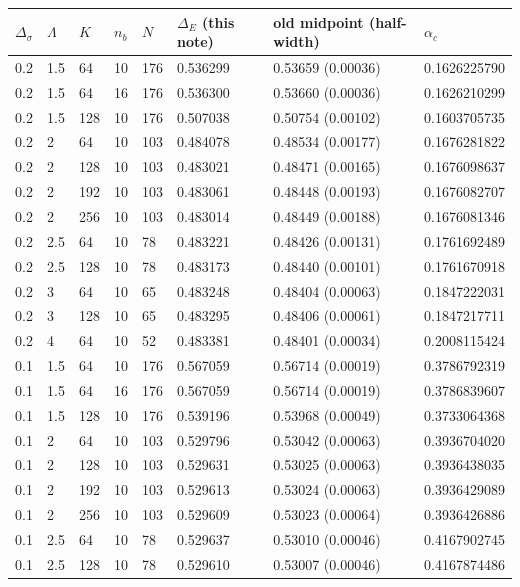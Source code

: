 \begin{tabular}{llllllll}
\toprule
$\Delta_\sigma$ & $\Lambda$ & $K$ & $n_b$ & $N$ & $\Delta_E$ (this note) & old midpoint (half-width) & $\alpha_c$ \\
\midrule
0.2 & 1.5 & 64 & 10 & 176 & 0.536299 & 0.53659 (0.00036) & 0.1626225790\\
0.2 & 1.5 & 64 & 16 & 176 & 0.536300 & 0.53660 (0.00036) & 0.1626210299\\
0.2 & 1.5 & 128 & 10 & 176 & 0.507038 & 0.50754 (0.00102) & 0.1603705735\\
0.2 & 2 & 64 & 10 & 103 & 0.484078 & 0.48534 (0.00177) & 0.1676281822\\
0.2 & 2 & 128 & 10 & 103 & 0.483021 & 0.48471 (0.00165) & 0.1676098637\\
0.2 & 2 & 192 & 10 & 103 & 0.483061 & 0.48448 (0.00193) & 0.1676082707\\
0.2 & 2 & 256 & 10 & 103 & 0.483014 & 0.48449 (0.00188) & 0.1676081346\\
0.2 & 2.5 & 64 & 10 & 78 & 0.483221 & 0.48426 (0.00131) & 0.1761692489\\
0.2 & 2.5 & 128 & 10 & 78 & 0.483173 & 0.48440 (0.00101) & 0.1761670918\\
0.2 & 3 & 64 & 10 & 65 & 0.483248 & 0.48404 (0.00063) & 0.1847222031\\
0.2 & 3 & 128 & 10 & 65 & 0.483295 & 0.48406 (0.00061) & 0.1847217711\\
0.2 & 4 & 64 & 10 & 52 & 0.483381 & 0.48401 (0.00034) & 0.2008115424\\
\midrule
0.1 & 1.5 & 64 & 10 & 176 & 0.567059 & 0.56714 (0.00019) & 0.3786792319\\
0.1 & 1.5 & 64 & 16 & 176 & 0.567059 & 0.56714 (0.00019) & 0.3786839607\\
0.1 & 1.5 & 128 & 10 & 176 & 0.539196 & 0.53968 (0.00049) & 0.3733064368\\
0.1 & 2 & 64 & 10 & 103 & 0.529796 & 0.53042 (0.00063) & 0.3936704020\\
0.1 & 2 & 128 & 10 & 103 & 0.529631 & 0.53025 (0.00063) & 0.3936438035\\
0.1 & 2 & 192 & 10 & 103 & 0.529613 & 0.53024 (0.00063) & 0.3936429089\\
0.1 & 2 & 256 & 10 & 103 & 0.529609 & 0.53023 (0.00064) & 0.3936426886\\
0.1 & 2.5 & 64 & 10 & 78 & 0.529637 & 0.53010 (0.00046) & 0.4167902745\\
0.1 & 2.5 & 128 & 10 & 78 & 0.529610 & 0.53007 (0.00046) & 0.4167874486\\

\end{tabular}
